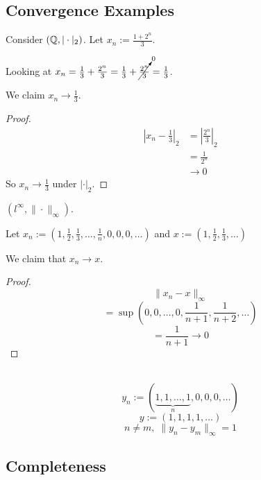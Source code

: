 \documentclass[12pt]{article}
\begin{document}
\subsection{Convergence Examples}


\bboxexam
\begin{exam}
    Consider \((\mathbb Q,|\cdot|_2)\). Let \(x_n:=\frac{1+2^n}3\).
    \bboxnote
    \begin{note}
        Looking at \(x_n=\frac13+\frac{2^n}3=\frac13+\cancelto0{\frac{2^n}3}=\frac13\).
    \end{note}
    \ebox
    We claim \(x_n\to\frac13\).
    \bboxproof
    \begin{proof}\
        \begin{align*}
            \left|x_n-\frac13\right|_2&=\left|\frac{2^n}3\right|_2\\
                           &=\frac1{2^n}\\
                           &\to 0
        \end{align*}
        So \(x_n\to\frac13\) under \(|\cdot|_2\).
    \end{proof}
    \ebox
\end{exam}
\ebox

\bboxexam
\begin{exam}
    \((l^\infty,\|\cdot\|_\infty)\).

    Let \(x_n:=\left(1,\frac12,\frac13,\dots,\frac1n,0,0,0,\dots\right)\) and
    \(x:=\left(1,\frac12,\frac13,\dots\right)\)

    We claim that \(x_n\to x\).
    \bboxproof
    \begin{proof}
        \[\|x_n-x\|_\infty\]
        \[=\sup\left(0,0,\dots,0,\frac1{n+1},\frac1{n+2},\dots\right)\]
        \[=\frac1{n+1}\to0\]
    \end{proof}
    \ebox
\end{exam}
\ebox

\bboxexam
\begin{exam}\
    \[y_n:=(\underset n{\underbrace{1,1,\dots,1}},0,0,0,\dots)\]
    \[y:=(1,1,1,1,\dots)\]
    \[n\neq m,\;
    \|y_n-y_m\|_\infty=1\]
\end{exam}
\ebox

\subsection{Completeness}
\end{document}
